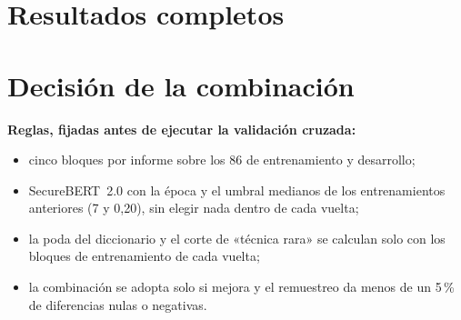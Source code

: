 \section{Resultados completos}

\begin{table}[H]
\centering
\small
{}
\caption{Resultados en prueba, con media y desviación de tres semillas.}
\end{table}

\begin{table}[H]
\centering
\small
{}
\caption{Diferencias con remuestreo emparejado por informe (10.000 muestras).}
\end{table}

\section{Decisión de la combinación}

\textbf{Reglas, fijadas antes de ejecutar la validación cruzada:}
\begin{itemize}
    \item cinco bloques por informe sobre los 86 de entrenamiento y desarrollo;
    \item SecureBERT~2.0 con la época y el umbral medianos de los entrenamientos anteriores (7 y 0,20), sin elegir nada dentro de cada vuelta;
    \item la poda del diccionario y el corte de «técnica rara» se calculan solo con los bloques de entrenamiento de cada vuelta;
    \item la combinación se adopta solo si mejora y el remuestreo da menos de un 5\,\% de diferencias nulas o negativas.
\end{itemize}

